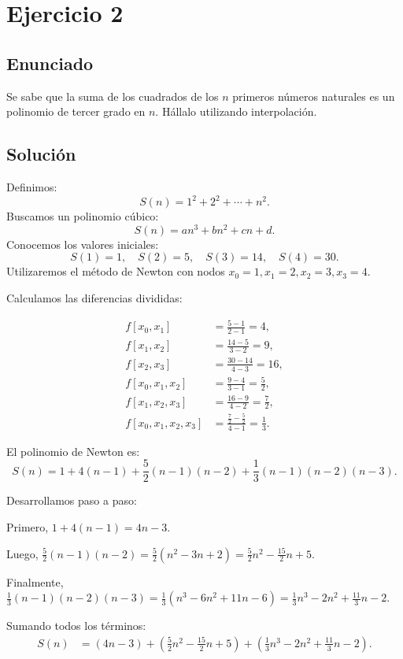 \documentclass[12pt]{article}
\begin{document}
	\section{Ejercicio 2}
	
	\subsection{Enunciado}
	Se sabe que la suma de los cuadrados de los \( n \) primeros números naturales es un polinomio de tercer grado en \( n \). Hállalo utilizando interpolación.
	
	\subsection{Solución}
	Definimos:
	\[
	S(n) = 1^2 + 2^2 + \cdots + n^2.
	\]
	Buscamos un polinomio cúbico:
	\[
	S(n) = an^3 + bn^2 + cn + d.
	\]
	Conocemos los valores iniciales:
	\[
	S(1) = 1,\quad S(2) = 5,\quad S(3) = 14,\quad S(4) = 30.
	\]
	Utilizaremos el método de Newton con nodos \( x_0 = 1, x_1 = 2, x_2 = 3, x_3 = 4 \).
	
	Calculamos las diferencias divididas:
	
	\[
	\begin{aligned}
		f[x_0, x_1] &= \frac{5 - 1}{2 - 1} = 4, \\
		f[x_1, x_2] &= \frac{14 - 5}{3 - 2} = 9, \\
		f[x_2, x_3] &= \frac{30 - 14}{4 - 3} = 16, \\
		f[x_0, x_1, x_2] &= \frac{9 - 4}{3 - 1} = \frac{5}{2}, \\
		f[x_1, x_2, x_3] &= \frac{16 - 9}{4 - 2} = \frac{7}{2}, \\
		f[x_0, x_1, x_2, x_3] &= \frac{\frac{7}{2} - \frac{5}{2}}{4 - 1} = \frac{1}{3}.
	\end{aligned}
	\]
	
	El polinomio de Newton es:
	\[
	S(n) = 1 + 4(n-1) + \frac{5}{2}(n-1)(n-2) + \frac{1}{3}(n-1)(n-2)(n-3).
	\]
	
	Desarrollamos paso a paso:
	
	Primero, \( 1 + 4(n-1) = 4n - 3 \).
	
	Luego, \( \frac{5}{2}(n-1)(n-2) = \frac{5}{2}(n^2 - 3n + 2) = \frac{5}{2}n^2 - \frac{15}{2}n + 5 \).
	
	Finalmente, \( \frac{1}{3}(n-1)(n-2)(n-3) = \frac{1}{3}(n^3 - 6n^2 + 11n - 6) = \frac{1}{3}n^3 - 2n^2 + \frac{11}{3}n - 2 \).
	
	Sumando todos los términos:
	\[
	\begin{aligned}
		S(n) &= \left(4n - 3\right) + \left(\frac{5}{2}n^2 - \frac{15}{2}n + 5\right) + \left(\frac{1}{3}n^3 - 2n^2 + \frac{11}{3}n - 2\right).
	\end{aligned}
	\]
	
\end{document}
